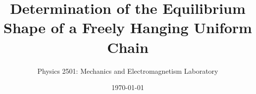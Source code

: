 \documentclass{revtex4}
\begin{document}

\title{Determination of the Equilibrium Shape of a Freely Hanging Uniform Chain}


\author{Physics 2501: Mechanics and Electromagnetism Laboratory}


\date{\today}



\setlength{\topmargin}{0in}

\maketitle

\end{document}
